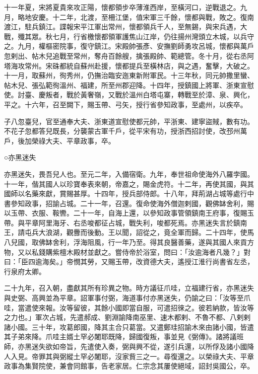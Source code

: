 \begin{pinyinscope}
 十一年夏，宋將夏貴來攻正陽，懷都領步卒薄淮西岸，至橫河口，逆戰退之。九月，略地安慶。十二年，北渡，至柵江堡，值宋軍三千餘，懷都與戰，敗之。復南渡江，駐兵鎮江。諜報宋平江軍出常州，懷都領兵千人，至無錫，與宋兵遇，大戰，殲其眾。秋七月，行省檄懷都領軍護焦山江岸，仍往揚州灣頭立木城，以兵守之。九月，權樞密院事，復守鎮江。宋殿帥張彥、安撫劉師勇攻呂城，懷都與萬戶忽剌出、帖木兒追戰至常州，奪舟百餘艘，擒張殿帥、範總管。冬十月，從右丞阿塔海攻常州。宋硃都統自蘇州赴援，懷都提兵至橫林店，與之遇，奮擊，大破之。十一月，取蘇州，徇秀州，仍撫治臨安迤東新附軍民。十三年秋，同元帥撒里蠻、帖木兒、張弘範徇溫州、福建，所至州郡迎降。十四年，授鎮國上將軍、浙東宣慰使。討臺、慶叛者，戰於黃奢嶺，又戰於溫州白塔屯寨，轉戰至於漳、泉、興化，平之。十六年，召至闕下，賜玉帶、弓矢，授行省參知政事，至處州，以疾卒。



 子八忽臺兒，官至通奉大夫、浙東道宣慰使都元帥，平浙東、建寧盜賊，數有功。不花子忽都答兒既長，分襲蒙古軍千戶，從平宋有功，授浙西招討使，改邳州萬戶，後加榮祿大夫、平章政事，卒。



 ○亦黑迷失



 亦黑迷失，畏吾兒人也。至元二年，入備宿衛。九年，奉世祖命使海外八羅孛國。十一年，偕其國人以珍寶奉表來朝，帝嘉之，賜金虎符。十二年，再使其國，與其國師以名藥來獻，賞賜甚厚。十四年，授兵部侍郎。十八年，拜荊湖占城等處行中書參知政事，招諭占城。二十一年，召還。復命使海外僧迦剌國，觀佛缽舍利，賜以玉帶、衣服、鞍轡。二十一年，自海上還，以參知政事管領鎮南王府事，復賜玉帶。與平章阿里海牙、右丞唆都征占城，戰失利，唆都死焉。亦黑迷失言於鎮南王，請屯兵大浪湖，觀釁而後動。王以聞，詔從之，竟全軍而歸。二十四年，使馬八兒國，取佛缽舍利，浮海阻風，行一年乃至。得其良醫善藥，遂與其國人來貢方物，又以私錢購紫檀木殿材並獻之。嘗侍帝於浴室，問曰：「汝逾海者凡幾？」對曰：「臣四逾海矣。」帝憫其勞，又賜玉帶，改資德大夫，遙授江淮行尚書省左丞，行泉府太卿。



 二十九年，召入朝，盡獻其所有珍異之物。時方議征爪哇，立福建行省，亦黑迷失與史弼、高興並為平章。詔軍事付弼，海道事付亦黑迷失，仍諭之曰：「汝等至爪哇，當遣使來報。汝等留彼，其餘小國即當自服，可遣招徠之。彼若納款，皆汝等之力也。」軍次占城，先遣郝成、劉淵諭降南巫里、速木都剌、不魯不都、八剌剌諸小國。三十年，攻葛郎國，降其主合只葛當。又遣鄭珪招諭木來由諸小國，皆遣其子弟來降。爪哇主婿土罕必闍耶既降，歸國復叛，事並見《弼傳》。諸將議班師，亦黑迷失欲如帝旨，先遣使入奏，弼與興不從，遂引兵還，以所俘及諸小國降人入見。帝罪其與弼縱土罕必闍耶，沒家貲三之一。尋復還之。以榮祿大夫、平章政事為集賢院使，兼會同館事，告老家居。仁宗念其屢使絕域，詔封吳國公，卒。




\end{pinyinscope}
